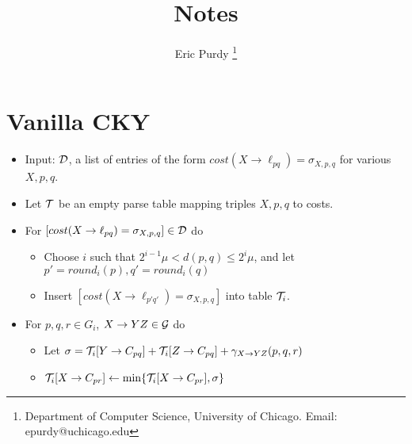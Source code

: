 \documentclass{article}
\title{Notes}
\author{Eric Purdy \footnote{Department of Computer Science, University of Chicago. Email: epurdy@uchicago.edu}}
\begin{document}
\maketitle

\section{Vanilla CKY}
\begin{itemize}

  \item Input: ${\mathcal D}$, a list of entries of the form $cost(X\to
  \ell_{pq})=\sigma_{X,p,q}$ for various $X,p,q$.

  \item Let ${\mathcal T}$ be an empty parse table mapping triples $X,p,q$ to
    costs.

  \item For $[cost(X\to \ell_{pq})=\sigma_{X,p,q}]\in {\mathcal D}$ do
  \begin{itemize}
    \item Choose $i$ such that $2^{i-1}\mu < d(p,q) \le 2^i \mu$, and let
    $p'=round_i(p), q'=round_i(q)$
    \item Insert $[cost(X\to \ell_{p'q'})=\sigma_{X,p,q}]$ into table
    ${\mathcal T}_i$.
  \end{itemize} 

    \item For $p,q,r \in G_i$, $X\to YZ\in {\mathcal G}$ do
    \begin{itemize}
      \item Let $\sigma = {\mathcal T}_i[Y\to C_{pq}] + {\mathcal T}_i[Z\to C_{pq}] + \gamma_{X\to YZ}(p,q,r)$
      \item ${\mathcal T}_i[X\to C_{pr}] \leftarrow \min \{{\mathcal T}_i[X\to C_{pr}], \sigma \}$
    \end{itemize}  

\end{itemize}
\end{document}
